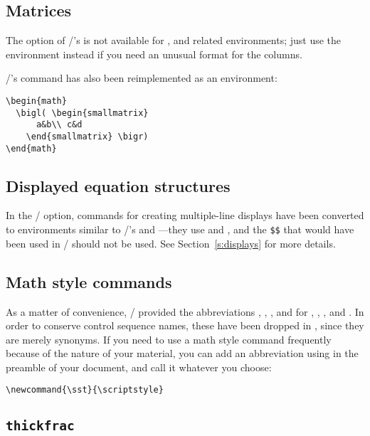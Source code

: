 \subsection{Matrices}
The  option of \amstex/'s  is not available for
,  and related
environments; just use the  environment
instead if you need an unusual format for the columns.

\amstex/'s  command has also been reimplemented
as an environment:
\begin{verbatim}
\begin{math}
  \bigl( \begin{smallmatrix}
      a&b\\ c&d
    \end{smallmatrix} \bigr)
\end{math}
\end{verbatim}

\subsection{Displayed equation structures}

 In the \latex/  option, commands for creating
multiple-line displays
have been converted to environments similar to \latex/'s
 and ---they use
 and , and the \verb"$$" that would have been used
in \amstex/ should not be used.  See Section~\ref{s:displays}
for more details.

\subsection{Math style commands}
As a matter of convenience, \amstex/ provided
the abbreviations , ,
, and  for
,
, , and .
In order to conserve control sequence names, these have
been dropped in , since they are merely synonyms.
If you need to use a math style command frequently because of the nature
of your material, you can add an abbreviation using
 in the preamble of your document,
and call it whatever you choose:
\begin{verbatim}
\newcommand{\sst}{\scriptstyle}
\end{verbatim}

\subsection{{\tt\bslash thickfrac}}

